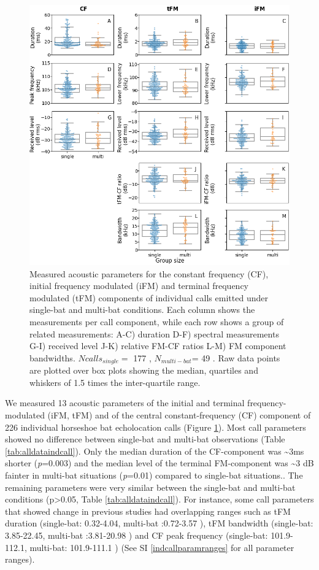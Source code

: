 \documentclass[
]{book}
\begin{document}
\begin{figure}
\includegraphics[width=1\linewidth]{original_papers/hbc-paper/combined_analysis/measurements_and_derivedparams_multipanel} \caption{\label{fig:indcallrawdata} Measured acoustic parameters for the constant frequency (CF), initial frequency modulated (iFM) and terminal frequency modulated (tFM) components of individual calls emitted under single-bat and multi-bat conditions. Each column shows the measurements per call component, while each row shows a group of related measurements: A-C) duration D-F) spectral measurements G-I) received level J-K) relative FM-CF ratios L-M) FM component bandwidths. $Ncalls_{single}=$ 177 , $N_{multi-bat}$= 49 . Raw data points are plotted over box plots showing the median, quartiles and whiskers of 1.5 times the inter-quartile range.}\label{fig:indcallrawdata}
\end{figure}

We measured 13 acoustic parameters of the initial and terminal frequency-modulated (iFM, tFM) and of the central constant-frequency (CF) component of 226 individual horseshoe bat echolocation calls (Figure \ref{fig:indcallrawdata}). Most call parameters showed no difference between single-bat and multi-bat observations (Table \ref{tab:alldataindcall}). Only the median duration of the CF-component was \textasciitilde3ms shorter (\emph{p}=0.003) and the median level of the terminal FM-component was \textasciitilde3 dB fainter in multi-bat situations (\emph{p}=0.01) compared to single-bat situations.. The remaining parameters were very similar between the single-bat and multi-bat conditions (p\textgreater0.05, Table \ref{tab:alldataindcall}). For instance, some call parameters that showed change in previous studies had overlapping ranges such as tFM duration (single-bat: 0.32-4.04, multi-bat :0.72-3.57 ), tFM bandwidth (single-bat: 3.85-22.45, multi-bat :3.81-20.98 ) and CF peak frequency (single-bat: 101.9-112.1, multi-bat: 101.9-111.1 ) (See SI \ref{indcallparamranges} for all parameter ranges).
\end{document}
